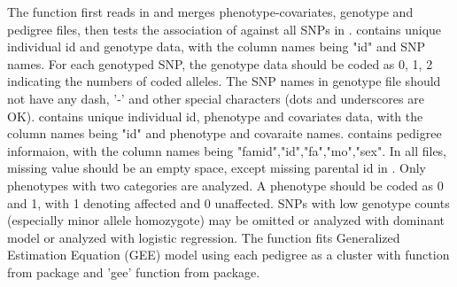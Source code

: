 \begin{Details}\relax
The  function first reads in and merges phenotype-covariates, genotype 
and pedigree files, then tests the association of  against all SNPs in .
 contains unique individual id and genotype data, with the column names being "id" and SNP names.
For each genotyped SNP, the genotype data should be coded as 0, 1, 2 indicating the numbers of coded 
alleles. The SNP names in genotype file should not have any 
dash, '-' and other special characters (dots and underscores are OK).  contains unique individual id, 
phenotype and covariates data, with the column names being "id" and phenotype and 
covaraite names.  contains pedigree informaion, with the column names being 
"famid","id","fa","mo","sex". In all files, missing value should be an empty space, except missing parental id in .
Only phenotypes with two categories are analyzed. A phenotype should be coded as 
0 and 1, with 1 denoting affected and 0 unaffected. SNPs with low genotype counts 
(especially minor allele homozygote) may be omitted or analyzed with dominant model or
analyzed with logistic regression. 
The  function fits Generalized Estimation Equation (GEE) model using each pedigree as a cluster 
with  function from  package and 'gee' function from  package.
\end{Details}
